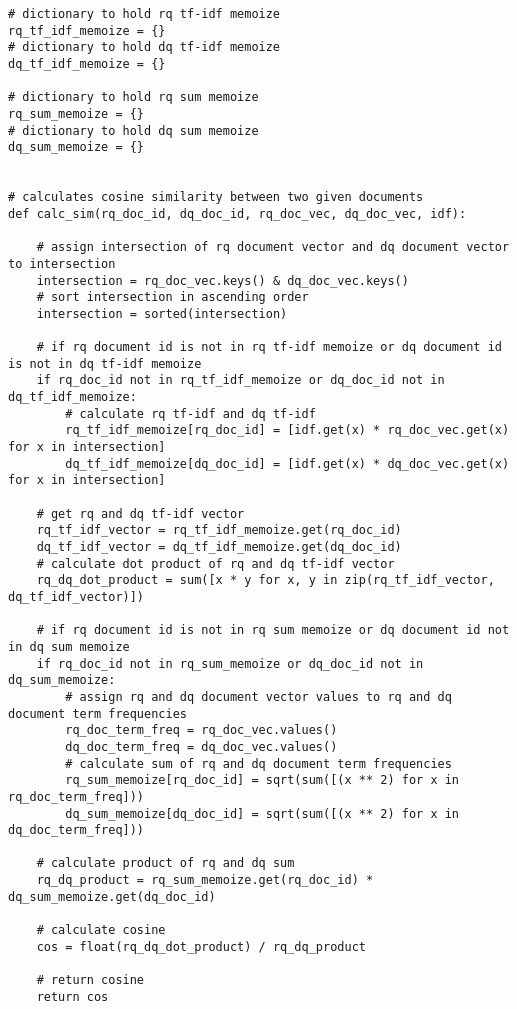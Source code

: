 \documentclass{article} %
\begin{document}
\begin{lstlisting}[style=Python]
# dictionary to hold rq tf-idf memoize
rq_tf_idf_memoize = {}
# dictionary to hold dq tf-idf memoize
dq_tf_idf_memoize = {}

# dictionary to hold rq sum memoize
rq_sum_memoize = {}
# dictionary to hold dq sum memoize
dq_sum_memoize = {}


# calculates cosine similarity between two given documents
def calc_sim(rq_doc_id, dq_doc_id, rq_doc_vec, dq_doc_vec, idf):

    # assign intersection of rq document vector and dq document vector to intersection
    intersection = rq_doc_vec.keys() & dq_doc_vec.keys()
    # sort intersection in ascending order
    intersection = sorted(intersection)
    
    # if rq document id is not in rq tf-idf memoize or dq document id is not in dq tf-idf memoize
    if rq_doc_id not in rq_tf_idf_memoize or dq_doc_id not in dq_tf_idf_memoize:
        # calculate rq tf-idf and dq tf-idf
        rq_tf_idf_memoize[rq_doc_id] = [idf.get(x) * rq_doc_vec.get(x) for x in intersection]
        dq_tf_idf_memoize[dq_doc_id] = [idf.get(x) * dq_doc_vec.get(x) for x in intersection]
    
    # get rq and dq tf-idf vector
    rq_tf_idf_vector = rq_tf_idf_memoize.get(rq_doc_id)
    dq_tf_idf_vector = dq_tf_idf_memoize.get(dq_doc_id)
    # calculate dot product of rq and dq tf-idf vector
    rq_dq_dot_product = sum([x * y for x, y in zip(rq_tf_idf_vector, dq_tf_idf_vector)])
    
    # if rq document id is not in rq sum memoize or dq document id not in dq sum memoize
    if rq_doc_id not in rq_sum_memoize or dq_doc_id not in dq_sum_memoize:
        # assign rq and dq document vector values to rq and dq document term frequencies
        rq_doc_term_freq = rq_doc_vec.values()
        dq_doc_term_freq = dq_doc_vec.values()
        # calculate sum of rq and dq document term frequencies
        rq_sum_memoize[rq_doc_id] = sqrt(sum([(x ** 2) for x in rq_doc_term_freq]))
        dq_sum_memoize[dq_doc_id] = sqrt(sum([(x ** 2) for x in dq_doc_term_freq]))
    
    # calculate product of rq and dq sum
    rq_dq_product = rq_sum_memoize.get(rq_doc_id) * dq_sum_memoize.get(dq_doc_id)
    
    # calculate cosine
    cos = float(rq_dq_dot_product) / rq_dq_product
    
    # return cosine
    return cos
\end{lstlisting}
\end{document}
